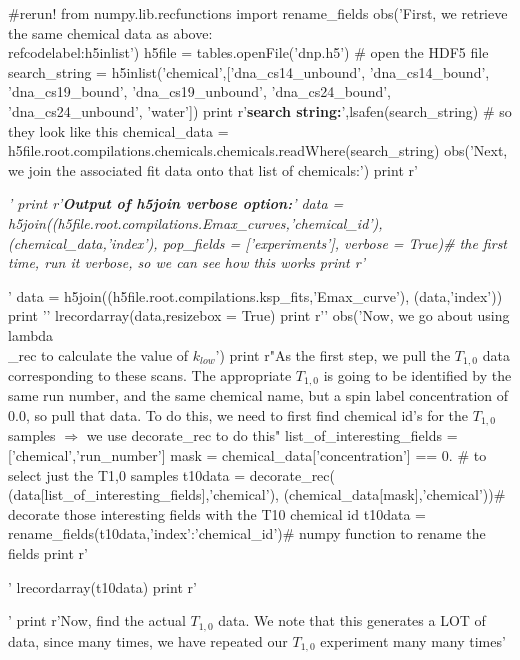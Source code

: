 \label{codelabel:h5label}
\begin{python}
#rerun!
from numpy.lib.recfunctions import rename_fields
obs('First, we retrieve the same chemical data as above:\\ref{codelabel:h5inlist}\n\n')
h5file = tables.openFile('dnp.h5') # open the HDF5 file
search_string = h5inlist('chemical',['dna_cs14_unbound',
    'dna_cs14_bound',
    'dna_cs19_bound',
    'dna_cs19_unbound',
    'dna_cs24_bound',
    'dna_cs24_unbound',
    'water'])
print r'\textbf{search string:}',lsafen(search_string) # so they look like this
chemical_data = h5file.root.compilations.chemicals.chemicals.readWhere(search_string)
obs('Next, we join the associated fit data onto that list of chemicals:\n\n')
print r'\begin{tiny}\begingroup \it'
print r'\textbf{Output of h5join verbose option:}'
data = h5join((h5file.root.compilations.Emax_curves,'chemical_id'),
    (chemical_data,'index'),
    pop_fields = ['experiments'],
    verbose = True)# the first time, run it verbose, so we can see how this works
print r'\endgroup\end{tiny}'
data = h5join((h5file.root.compilations.ksp_fits,'Emax_curve'),
    (data,'index'))
print '\n{}\n\n'
lrecordarray(data,resizebox = True)
print r'\label{codelabel:h5join_and_lambda_rec}'
obs('Now, we go about using lambda\\_rec to calculate the value of $k_{low}$')
print r"As the first step, we pull the $T_{1,0}$ data corresponding to these scans.  The appropriate $T_{1,0}$ is going to be identified by the same run number, and the same chemical name, but a spin label concentration of 0.0, so pull that data.  To do this, we need to first find chemical id's for the $T_{1,0}$ samples $\Rightarrow$ we use decorate\_rec to do this"
list_of_interesting_fields = ['chemical','run_number']
mask = chemical_data['concentration'] == 0. # to select just the T1,0 samples
t10data = decorate_rec( (data[list_of_interesting_fields],'chemical'),
    (chemical_data[mask],'chemical'))# decorate those interesting fields with the T10 chemical id
t10data = rename_fields(t10data,{'index':'chemical_id'})# numpy function to rename the fields
print r'\begin{tiny}'
lrecordarray(t10data)
print r'\end{tiny}'
print r'Now, find the actual $T_{1,0}$ data.  We note that this generates a LOT of data, since many times, we have repeated our $T_{1,0}$ experiment many many times'

\end{python}
